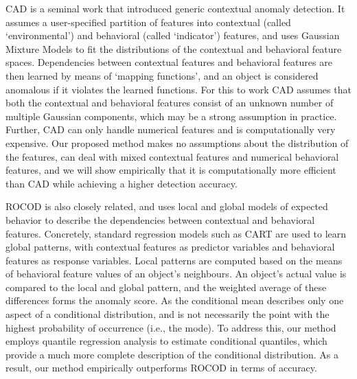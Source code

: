 \documentclass[pdflatex,sn-basic]{sn-jnl}%
\theoremstyle{thmstyleone}%
\theoremstyle{thmstyletwo}%
\theoremstyle{thmstylethree}%
\begin{document}
CAD \citep{song2007conditional} is a seminal work that introduced generic contextual anomaly detection. It assumes a user-specified partition of features into contextual (called `environmental') and behavioral (called `indicator') features, and uses Gaussian Mixture Models to fit the distributions of the contextual and behavioral feature spaces. Dependencies between contextual features and behavioral features are then learned by means of `mapping functions', and an object is considered anomalous if it violates the learned functions. For this to work CAD assumes that both the contextual and behavioral features consist of an unknown number of multiple Gaussian components, which may be a strong assumption in practice. Further, CAD can only handle numerical features and is computationally very expensive. Our proposed method makes no assumptions about the distribution of the features, can deal with mixed contextual features and numerical behavioral features, and we will show empirically that it is computationally more efficient than CAD while achieving a higher detection accuracy.

ROCOD \citep{liang2016robust} is also closely related, and uses local and global models of expected behavior to describe the dependencies between contextual and behavioral features. Concretely, standard regression models such as CART are used to learn global patterns, with contextual features as predictor variables and behavioral features as response variables. Local patterns are computed based on the means of behavioral feature values of an object's neighbours. An object's actual value is compared to the local and global pattern, and the weighted average of these differences forms the anomaly score. As the conditional mean describes only one aspect of a conditional distribution, and is not necessarily the point with the highest probability of occurrence (i.e., the mode). To address this, our method employs quantile regression analysis to estimate conditional quantiles, which provide a much more complete description of the conditional distribution. As a result, our method empirically outperforms ROCOD in terms of accuracy.
\end{document}
